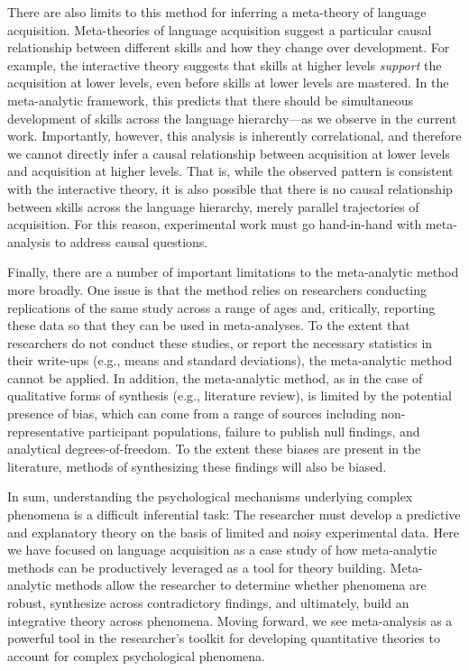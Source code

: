 \documentclass[9pt,twocolumn,twoside,lineno]{pnas-new}
\begin{document}
There are also limits to this method for inferring a meta-theory of
language acquisition. Meta-theories of language acquisition suggest a
particular causal relationship between different skills and how they
change over development. For example, the interactive theory suggests
that skills at higher levels \emph{support} the acquisition at lower
levels, even before skills at lower levels are mastered. In the
meta-analytic framework, this predicts that there should be simultaneous
development of skills across the language hierarchy---as we observe in
the current work. Importantly, however, this analysis is inherently
correlational, and therefore we cannot directly infer a causal
relationship between acquisition at lower levels and acquisition at
higher levels. That is, while the observed pattern is consistent with
the interactive theory, it is also possible that there is no causal
relationship between skills across the language hierarchy, merely
parallel trajectories of acquisition. For this reason, experimental work
must go hand-in-hand with meta-analysis to address causal questions.

Finally, there are a number of important limitations to the
meta-analytic method more broadly. One issue is that the method relies
on researchers conducting replications of the same study across a range
of ages and, critically, reporting these data so that they can be used
in meta-analyses. To the extent that researchers do not conduct these
studies, or report the necessary statistics in their write-ups (e.g.,
means and standard deviations), the meta-analytic method cannot be
applied. In addition, the meta-analytic method, as in the case of
qualitative forms of synthesis (e.g., literature review), is limited by
the potential presence of bias, which can come from a range of sources
including non-representative participant populations, failure to publish
null findings, and analytical degrees-of-freedom. To the extent these
biases are present in the literature, methods of synthesizing these
findings will also be biased.

In sum, understanding the psychological mechanisms underlying complex
phenomena is a difficult inferential task: The researcher must develop a
predictive and explanatory theory on the basis of limited and noisy
experimental data. Here we have focused on language acquisition as a
case study of how meta-analytic methods can be productively leveraged as
a tool for theory building. Meta-analytic methods allow the researcher
to determine whether phenomena are robust, synthesize across
contradictory findings, and ultimately, build an integrative theory
across phenomena. Moving forward, we see meta-analysis as a powerful
tool in the researcher's toolkit for developing quantitative theories to
account for complex psychological phenomena.
\end{document}
